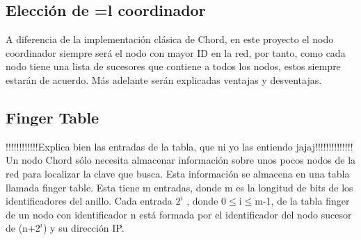 \documentclass[10pt, a4paper]{article}
\begin{document}
    \subsection{Elecci\'on de =l coordinador}
    A diferencia de la implementación clásica de Chord, en este proyecto el nodo coordinador siempre será el nodo con mayor ID en la red, por tanto, como cada nodo tiene una lista de sucesores que contiene a todos los nodos, estos siempre estarán de acuerdo. Más adelante serán explicadas ventajas y desventajas.\\
    
    \subsection{Finger Table} !!!!!!!!!!!!Explica bien las entradas de la tabla, que ni yo las entiendo jajaj!!!!!!!!!!!!!!\\
    Un nodo Chord sólo necesita almacenar información sobre unos pocos nodos de la red para localizar la clave que busca. Esta información se almacena en una tabla llamada finger table. Esta tiene m entradas, donde m es la longitud de bits de los identificadores del anillo. Cada entrada $2^i$ , donde 0$\leq$i$\leq$m-1, de la tabla finger de un nodo con identificador n está formada por el identificador del nodo sucesor de (n+$2^i$) y su dirección IP.\\
    
\end{document}
